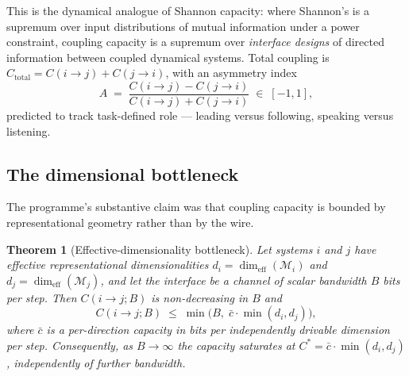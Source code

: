 \documentclass[11pt,a4paper]{article}
\theoremstyle{plain}
\newtheorem{theorem}{Theorem}
\theoremstyle{definition}
\theoremstyle{remark}
\begin{document}
This is the dynamical analogue of Shannon capacity: where Shannon's is a supremum over input
distributions of mutual information under a power constraint, coupling capacity is a supremum
over \emph{interface designs} of directed information between coupled dynamical systems. Total
coupling is $C_{\text{total}} = C(i\to j) + C(j\to i)$, with an asymmetry index
\begin{equation}\label{eq:asym}
A \;=\; \frac{C(i \to j) - C(j \to i)}{C(i \to j) + C(j \to i)} \;\in\; [-1, 1],
\end{equation}
predicted to track task-defined role --- leading versus following, speaking versus listening.

\subsection{The dimensional bottleneck}\label{sec:bottleneck}

The programme's substantive claim was that coupling capacity is bounded by representational
geometry rather than by the wire.

\begin{theorem}[Effective-dimensionality bottleneck]\label{thm:bottleneck}
Let systems $i$ and $j$ have effective representational dimensionalities
$d_i = \dim_{\mathrm{eff}}(\mathcal{M}_i)$ and $d_j = \dim_{\mathrm{eff}}(\mathcal{M}_j)$, and
let the interface be a channel of scalar bandwidth $B$ bits per step. Then
$C(i\to j; B)$ is non-decreasing in $B$ and
\begin{equation}\label{eq:bottleneck}
C(i \to j; B) \;\le\; \min\!\big(B,\; \bar{c}\cdot\min(d_i, d_j)\big),
\end{equation}
where $\bar{c}$ is a per-direction capacity in bits per independently drivable dimension per
step. Consequently, as $B \to \infty$ the capacity saturates at
$C^\ast = \bar{c}\cdot\min(d_i, d_j)$, independently of further bandwidth.
\end{theorem}
\end{document}
